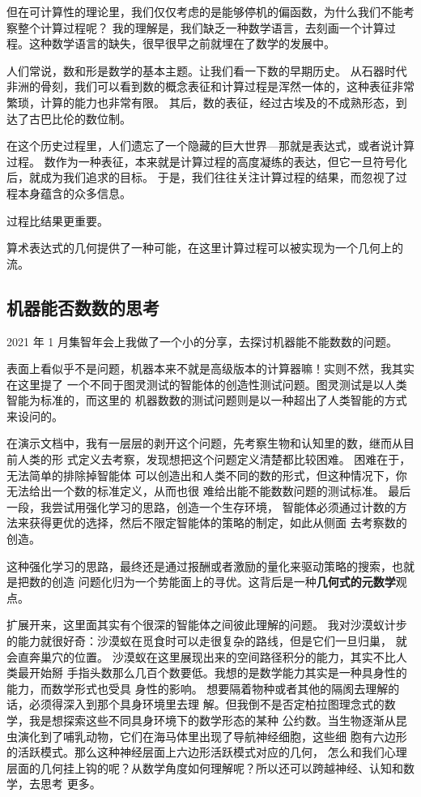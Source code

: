 \documentclass[a4paper,12pt]{article}
\numberwithin{problem}{section}
\numberwithin{definition}{section}
\numberwithin{lemma}{section}
\numberwithin{proposition}{section}
\numberwithin{theorem}{section}
\numberwithin{grammar}{section}
\numberwithin{program}{section}
\numberwithin{convention}{section}
\numberwithin{corollary}{section}
\begin{document}
但在可计算性的理论里，我们仅仅考虑的是能够停机的偏函数，为什么我们不能考察整个计算过程呢？
我的理解是，我们缺乏一种数学语言，去刻画一个计算过程。这种数学语言的缺失，很早很早之前就埋在了数学的发展中。

\begin{displayquote}
人们常说，数和形是数学的基本主题。让我们看一下数的早期历史。
从石器时代非洲的骨刻，我们可以看到数的概念表征和计算过程是浑然一体的，这种表征非常繁琐，计算的能力也非常有限。
其后，数的表征，经过古埃及的不成熟形态，到达了古巴比伦的数位制。

在这个历史过程里，人们遗忘了一个隐藏的巨大世界—那就是表达式，或者说计算过程。
数作为一种表征，本来就是计算过程的高度凝练的表达，但它一旦符号化后，就成为我们追求的目标。
于是，我们往往关注计算过程的结果，而忽视了过程本身蕴含的众多信息。

过程比结果更重要。
\end{displayquote}

算术表达式的几何提供了一种可能，在这里计算过程可以被实现为一个几何上的流。

\subsection{机器能否数数的思考}

2021 年 1 月集智年会上我做了一个小的分享，去探讨机器能不能数数的问题。

表面上看似乎不是问题，机器本来不就是高级版本的计算器嘛！实则不然，我其实在这里提了
一个不同于图灵测试的智能体的创造性测试问题。图灵测试是以人类智能为标准的，而这里的
机器数数的测试问题则是以一种超出了人类智能的方式来设问的。

在演示文档中，我有一层层的剥开这个问题，先考察生物和认知里的数，继而从目前人类的形
式定义去考察，发现想把这个问题定义清楚都比较困难。 困难在于，无法简单的排除掉智能体
可以创造出和人类不同的数的形式，但这种情况下，你无法给出一个数的标准定义，从而也很
难给出能不能数数问题的测试标准。 最后一段，我尝试用强化学习的思路，创造一个生存环境，
智能体必须通过计数的方法来获得更优的选择，然后不限定智能体的策略的制定，如此从侧面
去考察数的创造。

这种强化学习的思路，最终还是通过报酬或者激励的量化来驱动策略的搜索，也就是把数的创造
问题化归为一个势能面上的寻优。这背后是一种\textbf{几何式的元数学}观点。

扩展开来，这里面其实有个很深的智能体之间彼此理解的问题。
我对沙漠蚁计步的能力就很好奇：沙漠蚁在觅食时可以走很复杂的路线，但是它们一旦归巢，
就会直奔巢穴的位置。 沙漠蚁在这里展现出来的空间路径积分的能力，其实不比人类最开始掰
手指头数那么几百个数要低。我想的是数学能力其实是一种具身性的能力，而数学形式也受具
身性的影响。 想要隔着物种或者其他的隔阂去理解的话，必须得深入到那个具身环境里去理
解。但我倒不是否定柏拉图理念式的数学，我是想探索这些不同具身环境下的数学形态的某种
公约数。当生物逐渐从昆虫演化到了哺乳动物，它们在海马体里出现了导航神经细胞，这些细
胞有六边形的活跃模式。那么这种神经层面上六边形活跃模式对应的几何， 怎么和我们心理
层面的几何挂上钩的呢？从数学角度如何理解呢？所以还可以跨越神经、认知和数学，去思考
更多。
\end{document}
